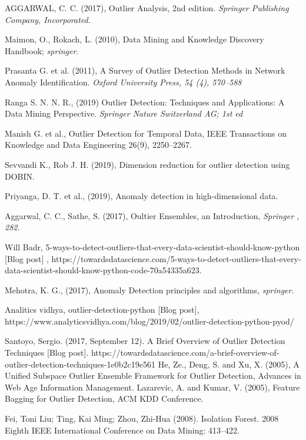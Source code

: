 \begin{thebibliography}{99}

 AGGARWAL, C. C. (2017),  Outlier Analysis, 2nd edition. {\it Springer Publishing Company, Incorporated.} 

  Maimon, O.,  Rokach, L. (2010), Data Mining and Knowledge Discovery Handbook; {\it springer}. 

 Prasanta G. et al. (2011), A Survey of Outlier Detection Methods in Network Anomaly Identification. {\it Oxford University Press, 54 (4), 570--588 }

 Ranga S. N. N. R., (2019) Outlier Detection: Techniques and Applications: A Data Mining Perspective. {\it Springer Nature Switzerland AG; 1st ed}

 Manish G. et al., Outlier Detection for Temporal Data, IEEE Transactions on Knowledge and Data Engineering 26(9), 2250–2267.

 Sevvandi K., Rob J. H. (2019), Dimension reduction for outlier detection using DOBIN.

 Priyanga, D. T. et al., (2019),  Anomaly detection in high-dimensional data.

 Aggarwal, C. C., Sathe, S. (2017), Oultier Ensembles, an Introduction, {\it Springer , 282.}

 Will Badr,  5-ways-to-detect-outliers-that-every-data-scientist-should-know-python [Blog post] , https://towardsdatascience.com/5-ways-to-detect-outliers-that-every-data-scientist-should-know-python-code-70a54335a623. 

 Mehotra, K. G.,  (2017),  Anomaly Detection principles and algorithms, {\it springer}. 

  Analitics vidhya, outlier-detection-python [Blog post], https://www.analyticsvidhya.com/blog/2019/02/outlier-detection-python-pyod/

 Santoyo, Sergio. (2017, September 12). A Brief Overview of Outlier Detection Techniques [Blog post]. https://towardsdatascience.com/a-brief-overview-of-outlier-detection-techniques-1e0b2c19e561
 He, Ze., Deng, S. and Xu, X. (2005), A Unified Subspace Outlier Ensemble Framework for Outlier Detection, Advances in Web Age Information Management.
 Lazarevic, A.  and Kumar, V. (2005), Feature Bagging for Outlier Detection, ACM KDD Conference.

 Fei, Toni Liu; Ting, Kai Ming; Zhou, Zhi-Hua (2008). Isolation Forest. 2008 Eighth IEEE International Conference on Data Mining: 413–422.

\end{thebibliography}







